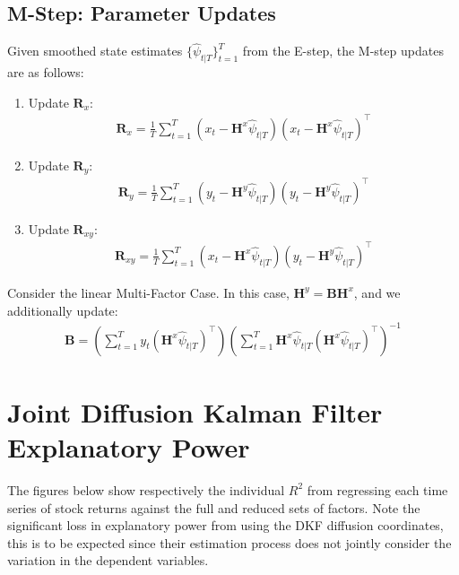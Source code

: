 \documentclass[11pt]{article}
\theoremstyle{plain}
\theoremstyle{definition}
\theoremstyle{remark}
\numberwithin{equation}{section}
\begin{document}
\subsection{M-Step: Parameter Updates}

Given smoothed state estimates $\{\hat{\psi}_{t|T}\}_{t=1}^T$ from the E-step, the M-step updates are as follows:

\begin{enumerate}
    \item {Update $\mathbf{R}_x$:}
    \begin{align*}
    \mathbf{R}_x = \frac{1}{T} \sum_{t=1}^{T} \left( x_t - \mathbf{H}^x \hat{\psi}_{t|T} \right) \left( x_t - \mathbf{H}^x \hat{\psi}_{t|T} \right)^\top
    \end{align*}
    
    \item {Update $\mathbf{R}_y$:}
    \begin{align*}
    \mathbf{R}_y = \frac{1}{T} \sum_{t=1}^{T} \left( y_t - \mathbf{H}^y \hat{\psi}_{t|T} \right) \left( y_t - \mathbf{H}^y \hat{\psi}_{t|T} \right)^\top
    \end{align*}
    
    \item {Update $\mathbf{R}_{xy}$:}
    \begin{align*}
    \mathbf{R}_{xy} = \frac{1}{T} \sum_{t=1}^{T} \left( x_t - \mathbf{H}^x \hat{\psi}_{t|T} \right) \left( y_t - \mathbf{H}^y \hat{\psi}_{t|T} \right)^\top
    \end{align*}
\end{enumerate}

Consider the linear Multi-Factor Case. In this case,  $\mathbf{H}^y = \mathbf{B}\mathbf{H}^x$, and we additionally update:
\begin{align*}
\mathbf{B} = \left( \sum_{t=1}^{T} y_t (\mathbf{H}^x \hat{\psi}_{t|T})^\top \right) \left( \sum_{t=1}^T \mathbf{H}^x \hat{\psi}_{t|T} (\mathbf{H}^x \hat{\psi}_{t|T})^\top \right)^{-1}
\end{align*}

\section{Joint Diffusion Kalman Filter Explanatory Power}
\label{sec:appb}

\setcounter{table}{0}
\setcounter{figure}{0}
\renewcommand{\thetable}{C.\arabic{table}}
\renewcommand{\thefigure}{C.\arabic{figure}}
The figures below show respectively the individual $R^2$ from regressing each time series of stock returns against the full and reduced sets of factors. Note the significant loss in explanatory power from using the DKF diffusion coordinates, this is to be expected since their estimation process does not jointly consider the variation in the dependent variables.
\end{document}
